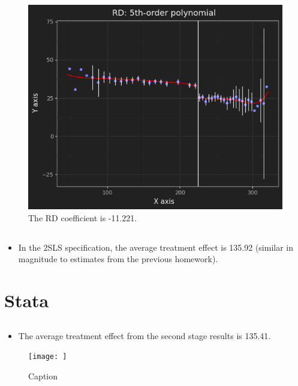 \documentclass{article}
\begin{document}
\clearpage

\subsection{}
\begin{figure}[!h]
    \centering
    \includegraphics[scale=.9]{homework6/output/rdplot3.png}
    \caption{The RD coefficient is -11.221.}
    \label{fig:figure4}
\end{figure}

\subsection{}
\begin{itemize}
    \item In the 2SLS specification, the average treatment effect is 135.92 (similar in magnitude to estimates from the previous homework).
\end{itemize}

\section{Stata}
\subsection{}
\begin{itemize}
    \item The average treatment effect from the second stage results is 135.41.
\end{itemize}

\begin{figure}
    \centering
    \texttt{[image: ]}
    \caption{Caption}
    \label{fig:my_label}
\end{figure}
\end{document}
